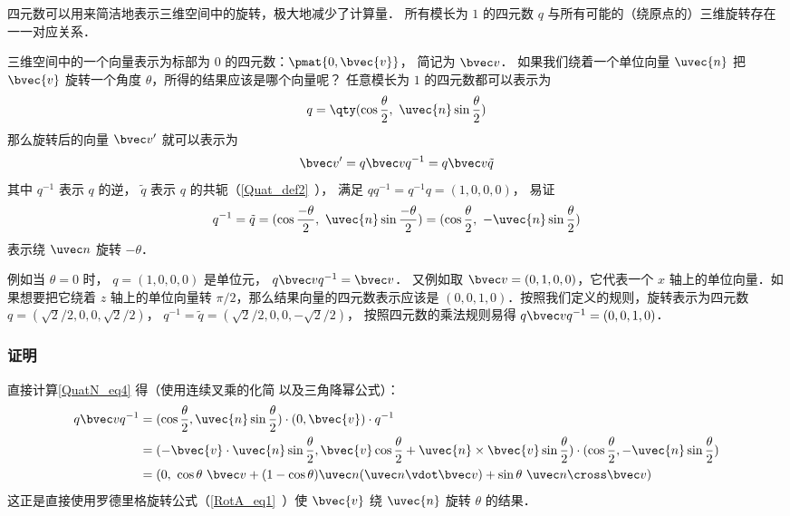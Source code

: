 

四元数可以用来简洁地表示三维空间中的旋转，极大地减少了计算量． 所有模长为 $1$ 的四元数 $q$ 与所有可能的（绕原点的）三维旋转存在一一对应关系．

三维空间中的一个向量表示为标部为 $0$ 的四元数：$\pmat{0, \bvec{v}}$， 简记为 $\bvec v$． 如果我们绕着一个单位向量 ${\uvec{n}}$ 把 $\bvec{v}$ 旋转一个角度 $\theta$，所得的结果应该是哪个向量呢？ 任意模长为 $1$ 的四元数都可以表示为
\begin{equation}
q = \qty(\cos{\frac{\theta}{2}},\ {\uvec{n}}\sin{\frac{\theta}{2}})
\end{equation}
那么旋转后的向量 $\bvec v'$ 就可以表示为
\begin{equation}\label{QuatN_eq4}
\bvec v' = q\bvec vq^{-1} = q\bvec v \tilde q
\end{equation}
其中 $q^{-1}$ 表示 $q$ 的逆， $\tilde q$ 表示 $q$ 的共轭（\autoref{Quat_def2}~）， 满足 $qq^{-1} = q^{-1}q = (1,0,0,0)$， 易证
\begin{equation}
q^{-1} = \tilde q = (\cos{\frac{-\theta}{2}},\ {\uvec{n}}\sin{\frac{-\theta}{2}})
= (\cos{\frac{\theta}{2}},\ -{\uvec{n}}\sin{\frac{\theta}{2}})
\end{equation}
表示绕 $\uvec n$ 旋转 $-\theta$．

例如当 $\theta = 0$ 时， $q = (1,0,0,0)$ 是单位元， $q\bvec vq^{-1} = \bvec v$． 又例如取 $\bvec v = (0, 1, 0, 0)$，它代表一个 $x$ 轴上的单位向量．如果想要把它绕着 $z$ 轴上的单位向量转 $\pi/2$，那么结果向量的四元数表示应该是 $(0, 0, 1, 0)$．按照我们定义的规则，旋转表示为四元数 $q=(\sqrt{2}/2, 0, 0, \sqrt{2}/2)$， $q^{-1} = \tilde q = (\sqrt{2}/2,0,0,-\sqrt{2}/2)$， 按照四元数的乘法规则易得 $q\bvec v q^{-1}=(0,0,1,0)$．

\subsubsection{证明}
直接计算\autoref{QuatN_eq4} 得（使用连续叉乘的化简 以及三角降幂公式）：
\begin{equation}
\begin{aligned}
q\bvec vq^{-1}&= (\cos{\frac{\theta}{2}}, {\uvec{n}}\sin{\frac{\theta}{2}})\cdot (0, \bvec{v})\cdot q^{-1}\\&
=(-\bvec{v}\cdot {\uvec{n}}\sin{\frac{\theta}{2}}, \bvec{v}\cos{\frac{\theta}{2}}+ {\uvec{n}}\times\bvec{v}\sin{\frac{\theta}{2}})\cdot (\cos{\frac{\theta}{2}}, -{\uvec{n}}\sin{\frac{\theta}{2}})\\&
= (0,\ \cos\theta\ \bvec v + (1-\cos\theta)\uvec n(\uvec n\vdot \bvec v) + \sin\theta\ \uvec n\cross\bvec v)
\end{aligned}
\end{equation}
这正是直接使用罗德里格旋转公式（\autoref{RotA_eq1}~）使 $\bvec{v}$ 绕 ${\uvec{n}}$ 旋转 $\theta$ 的结果．

